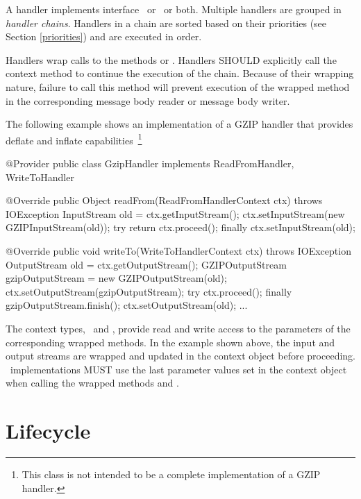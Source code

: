 A handler implements interface \ReadFromHandler\ or \WriteToHandler\ or both. Multiple handlers are grouped in \emph{handler chains}. Handlers in a chain are sorted based on their priorities (see Section \ref{priorities}) and are executed in order. 

Handlers wrap calls to the methods  or . Handlers SHOULD explicitly call the context method   to continue the execution of the chain. Because of their wrapping nature, failure to call this method will prevent execution of the wrapped method in the corresponding message body reader or message body writer.

The following example shows an implementation of a GZIP handler that provides deflate and inflate capabilities~\footnote{This class is not intended to be a complete implementation of a GZIP handler.}

\begin{listing}{1}
@Provider
public class GzipHandler implements ReadFromHandler, WriteToHandler {

    @Override
    public Object readFrom(ReadFromHandlerContext ctx) throws IOException {
        InputStream old = ctx.getInputStream();
        ctx.setInputStream(new GZIPInputStream(old));
        try {
            return ctx.proceed();
        } finally {
            ctx.setInputStream(old);
        }
    }

    @Override
    public void writeTo(WriteToHandlerContext ctx) throws IOException {
        OutputStream old = ctx.getOutputStream();
        GZIPOutputStream gzipOutputStream = new GZIPOutputStream(old);
        ctx.setOutputStream(gzipOutputStream);
        try {
            ctx.proceed();
        } finally {
            gzipOutputStream.finish();
            ctx.setOutputStream(old);
        }
    }
    ...
}
\end{listing}

The context types, \ReadFromHandlerContext\ and \WriteToHandlerContext, provide read and write access to the parameters of the corresponding wrapped methods. In the example shown above, the input and output streams are wrapped and updated in the context object before proceeding. \jaxrs\ implementations MUST use the last parameter values set in the context object when calling the wrapped methods  and .

\section{Lifecycle}

